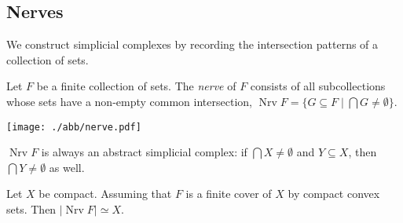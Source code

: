 \begin{multicols*}{3}
\subsection{Nerves} 
{\myfont We construct simplicial complexes by recording the intersection patterns of a collection of sets.} \vspace{-0.6pc}
\begin{definition}[Nerve]
Let ${F}$ be a finite collection of sets. The \emph{nerve} of ${F}$ consists of all subcollections whose sets have a non-empty common intersection,
$
\operatorname{Nrv} F = \{G\subseteq {F} \mid \bigcap G \neq \emptyset\}.
$
\begin{center}
\vspace{-0.8pc}
\texttt{[image: ./abb/nerve.pdf]}
\vspace{-0.7pc}
\end{center}
\end{definition}
\rspace
\begin{rem}
$\operatorname{Nrv} F$ is always an abstract simplicial complex: if $\bigcap X \neq \emptyset$ and $Y\subseteq X$, then $\bigcap Y \neq \emptyset$ as well.
\end{rem}
\rspace
\begin{theorem}Let $X$ be compact.
Assuming that $F$ is a finite cover of $X$ by compact convex sets. Then $|\operatorname{Nrv} F| \simeq X$.
\end{theorem}
\rspace
\drawaline \vspace{-0.5pc}

\end{multicols*}
